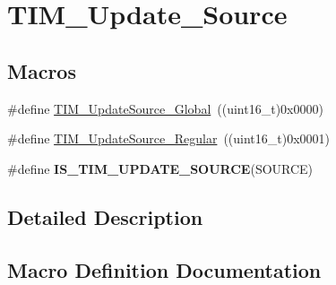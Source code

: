 \hypertarget{group___t_i_m___update___source}{}\section{T\+I\+M\+\_\+\+Update\+\_\+\+Source}
\label{group___t_i_m___update___source}
\subsection*{Macros}
\begin{DoxyCompactItemize}
\item 
\#define \hyperlink{group___t_i_m___update___source_ga32c67bc3f8211a2c7b44ee9fe1523875}{T\+I\+M\+\_\+\+Update\+Source\+\_\+\+Global}~((uint16\+\_\+t)0x0000)
\item 
\#define \hyperlink{group___t_i_m___update___source_ga6f50423cdb011137ae8cd303ccd2080c}{T\+I\+M\+\_\+\+Update\+Source\+\_\+\+Regular}~((uint16\+\_\+t)0x0001)
\item 
\#define {\bfseries I\+S\+\_\+\+T\+I\+M\+\_\+\+U\+P\+D\+A\+T\+E\+\_\+\+S\+O\+U\+R\+CE}(S\+O\+U\+R\+CE)
\end{DoxyCompactItemize}


\subsection{Detailed Description}


\subsection{Macro Definition Documentation}
